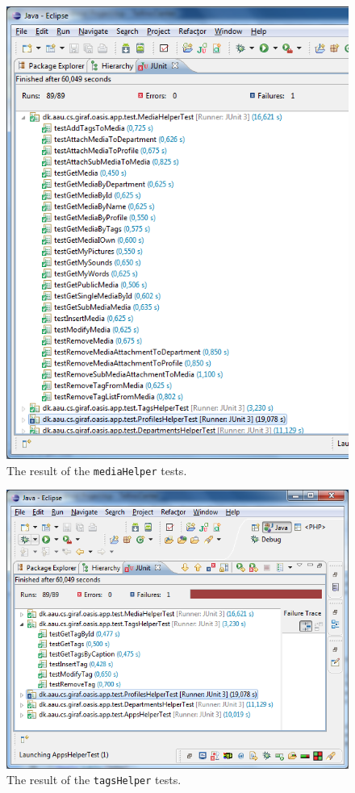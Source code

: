 \begin{figure}[htbp]
	\centering
		\includegraphics[width=\textwidth]{Images/unit_testing/media_helper_tests.PNG}
	\caption{The result of the \texttt{mediaHelper} tests.}
	\label{fig:media_helper_tests}
\end{figure}



\begin{figure}[htbp]
	\centering
		\includegraphics[width=\textwidth]{Images/unit_testing/tag_helper_tests.PNG}
	\caption{The result of the \texttt{tagsHelper} tests.}
	\label{fig:tag_helper_tests}
\end{figure}
